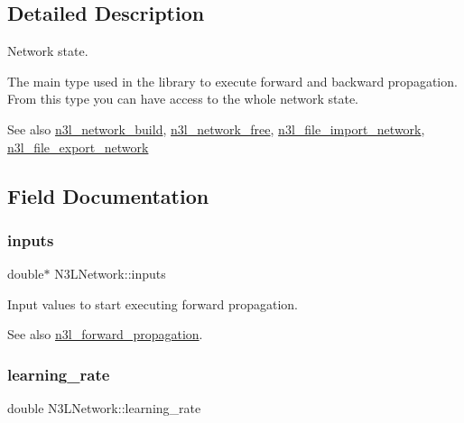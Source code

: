 \subsection{Detailed Description}
Network state. 

The main type used in the library to execute forward and backward propagation. From this type you can have access to the whole network state.

\begin{DoxySeeAlso}{See also}
\hyperlink{n3__network_8c_a5f87e1efebd658dd55d7d2ca1768bdba}{n3l\+\_\+network\+\_\+build}, \hyperlink{n3__network_8c_a327ffd586b67f586743d72a146c4ea95}{n3l\+\_\+network\+\_\+free}, \hyperlink{n3__file_8c_a4fef76548ed87845dceafaa9527a83d0}{n3l\+\_\+file\+\_\+import\+\_\+network}, \hyperlink{n3__file_8c_aea5e504fe0f565507b01729737f16341}{n3l\+\_\+file\+\_\+export\+\_\+network} 
\end{DoxySeeAlso}


\subsection{Field Documentation}
\mbox{\label{structN3LNetwork_a45ff5bcae18502559925aba0cbd0313b}} 
\subsubsection{\texorpdfstring{inputs}{inputs}}
{\footnotesize\ttfamily double$\ast$ N3\+L\+Network\+::inputs}

Input values to start executing forward propagation. \begin{DoxySeeAlso}{See also}
\hyperlink{n3__forward_8c_abc37ac7f137db4d053e3b19ac8e6542a}{n3l\+\_\+forward\+\_\+propagation}. 
\end{DoxySeeAlso}
\mbox{\label{structN3LNetwork_ae7c5e2ed74786685185cf2cbb955bf51}} 
\subsubsection{\texorpdfstring{learning\+\_\+rate}{learning\_rate}}
{\footnotesize\ttfamily double N3\+L\+Network\+::learning\+\_\+rate}

